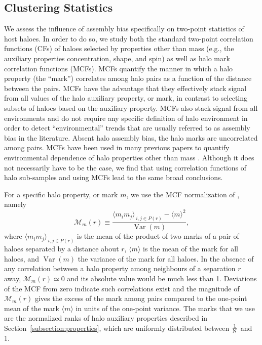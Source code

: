 \documentclass[usenatbib,fleqn]{mnras}
\begin{document}
\subsection{Clustering Statistics}
\label{subsection:clusteringstatistics}


We assess the influence of assembly bias specifically on two-point statistics of host haloes. In order to do so, we study both the standard two-point correlation functions (CFs) of haloes selected by properties other than mass (e.g., the auxiliary properties concentration, shape, and spin) as well as halo mark correlation functions (MCFs). MCFs quantify the manner in which a halo property (the ``mark'') correlates among halo pairs as a function of the distance between the pairs. MCFs have the advantage that they effectively stack signal from all values of the halo auxiliary property, or mark, in contrast to selecting subsets of haloes based on the auxiliary property. MCFs also stack signal from all environments and do not require any specific definition of halo environment in order to detect ``environmental'' trends that are usually referred to as assembly bias in the literature. Absent halo assembly bias, the halo marks are uncorrelated among pairs. MCFs have been used in many previous papers to quantify environmental dependence of halo properties other than mass \citep{sheth_tormen04,sheth05, skibba_etal06, harker_etal06,wechsler_etal06,mao_etal15}. Although it does not necessarily have to be the case, we find that using correlation functions of halo sub-samples and using MCFs lead to the same broad conclusions. 

For a specific halo property, or mark $m$, we use the MCF normalization of \citet{wechsler_etal06}, namely 
%
\begin{equation}
\label{eq:mcf}
\mathcal{M}_m(r) \equiv \frac{\langle m_i m_j \rangle_{\,i,j \in P(r)} - 
\langle m \rangle^2}{\operatorname{Var}(m)},
\end{equation}
%
where $\langle m_i m_j \rangle_{\,i,j \in P(r)}$ is the mean of the product of two marks of a pair of haloes separated by a distance about $r$, $\langle m \rangle$ is the mean of the mark for all haloes, and $\operatorname{Var}(m)$ the variance of the mark for all haloes.
In the absence of any correlation between a halo property among neighbours of a separation $r$ away, $\mathcal{M}_m(r) \simeq 0$ and its absolute value would be much less than 1. Deviations of the MCF from zero indicate such correlations exist and the magnitude of $\mathcal{M}_m(r)$ gives the excess of the mark among pairs compared to the one-point mean of the mark $\langle m\rangle$ in units of the one-point variance. The marks that we use are the normalized ranks of halo auxiliary properties described in Section~\ref{subsection:properties}, which are uniformly distributed between $\frac{1}{{\rm N}}$ and 1.
\end{document}
